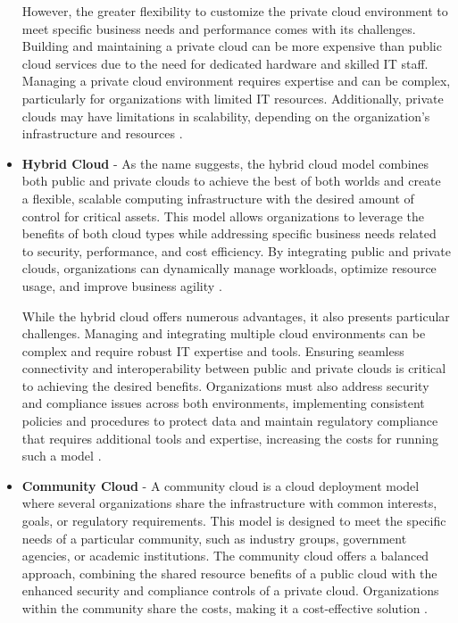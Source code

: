 \begin{itemize}
    However, the greater flexibility to customize the private cloud environment to meet specific business needs and performance comes with its challenges. Building and maintaining a private cloud can be more expensive than public cloud services due to the need for dedicated hardware and skilled IT staff. Managing a private cloud environment requires expertise and can be complex, particularly for organizations with limited IT resources. Additionally, private clouds may have limitations in scalability, depending on the organization's infrastructure and resources \citep{private_cloud}. \newline
    \item  \textbf{Hybrid Cloud} - As the name suggests, the hybrid cloud model combines both public and private clouds to achieve the best of both worlds and create a flexible, scalable computing infrastructure with the desired amount of control for critical assets. This model allows organizations to leverage the benefits of both cloud types while addressing specific business needs related to security, performance, and cost efficiency. By integrating public and private clouds, organizations can dynamically manage workloads, optimize resource usage, and improve business agility \citep{cloudmodel}.

    While the hybrid cloud offers numerous advantages, it also presents particular challenges. Managing and integrating multiple cloud environments can be complex and require robust IT expertise and tools. Ensuring seamless connectivity and interoperability between public and private clouds is critical to achieving the desired benefits. Organizations must also address security and compliance issues across both environments, implementing consistent policies and procedures to protect data and maintain regulatory compliance that requires additional tools and expertise, increasing the costs for running such a model \citep{hybrid_model}.
   
    \item  \textbf{Community Cloud} - A community cloud is a cloud deployment model where several organizations share the infrastructure with common interests, goals, or regulatory requirements. This model is designed to meet the specific needs of a particular community, such as industry groups, government agencies, or academic institutions. The community cloud offers a balanced approach, combining the shared resource benefits of a public cloud with the enhanced security and compliance controls of a private cloud. Organizations within the community share the costs, making it a cost-effective solution \citep{cloudmodel}.
\end{itemize}


